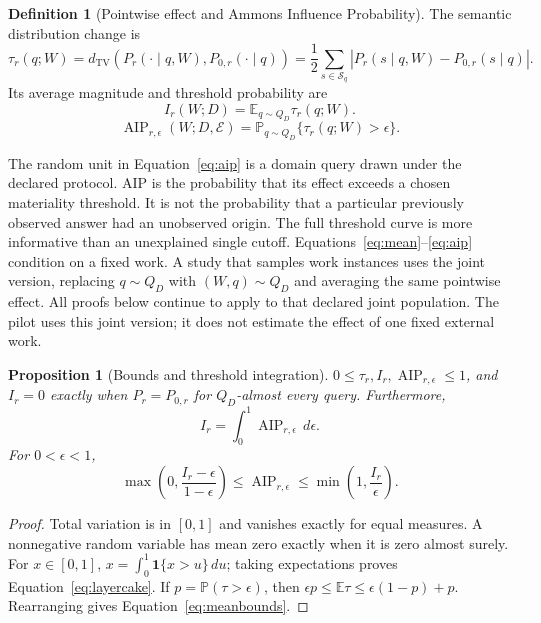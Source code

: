 \documentclass[11pt,letterpaper]{article}
\newtheorem{proposition}[theorem]{Proposition}
\theoremstyle{definition}\newtheorem{definition}[theorem]{Definition}
\newcommand{\TV}{d_{\mathrm{TV}}}
\newcommand{\AIP}{\operatorname{AIP}}
\newcommand{\E}{\mathbb{E}}
\newcommand{\Prob}{\mathbb{P}}
\newcommand{\ind}{\mathbf{1}}
\newcommand{\calE}{\mathcal{E}}
\begin{document}
\begin{definition}[Pointwise effect and Ammons Influence Probability]
The semantic distribution change is
\begin{equation}
\tau_r(q;W)=\TV\!\left(P_r(\cdot\mid q,W),P_{0,r}(\cdot\mid q)\right)
=\frac12\sum_{s\in\mathcal S_q}|P_r(s\mid q,W)-P_{0,r}(s\mid q)|.
\label{eq:tau}
\end{equation}
Its average magnitude and threshold probability are
\begin{equation}
I_r(W;D)=\E_{q\sim Q_D}\tau_r(q;W).\label{eq:mean}
\end{equation}
\begin{equation}
\boxed{\AIP_{r,\epsilon}(W;D,\calE)
=\Prob_{q\sim Q_D}\{\tau_r(q;W)>\epsilon\}.}\label{eq:aip}
\end{equation}
\end{definition}

The random unit in Equation~\eqref{eq:aip} is a domain query drawn under the declared protocol. AIP is the probability that its effect exceeds a chosen materiality threshold. It is not the probability that a particular previously observed answer had an unobserved origin. The full threshold curve is more informative than an unexplained single cutoff.
Equations~\eqref{eq:mean}--\eqref{eq:aip} condition on a fixed work. A study that samples work instances uses the joint version, replacing $q\sim Q_D$ with $(W,q)\sim Q_D$ and averaging the same pointwise effect. All proofs below continue to apply to that declared joint population. The pilot uses this joint version; it does not estimate the effect of one fixed external work.

\begin{proposition}[Bounds and threshold integration]
$0\le \tau_r,I_r,\AIP_{r,\epsilon}\le1$, and $I_r=0$ exactly when $P_r=P_{0,r}$ for $Q_D$-almost every query. Furthermore,
\begin{equation}
I_r=\int_0^1\AIP_{r,\epsilon}\,d\epsilon.
\label{eq:layercake}
\end{equation}
For $0<\epsilon<1$,
\begin{equation}
\max\!\left(0,\frac{I_r-\epsilon}{1-\epsilon}\right)
\le\AIP_{r,\epsilon}
\le\min\!\left(1,\frac{I_r}{\epsilon}\right).
\label{eq:meanbounds}
\end{equation}
\end{proposition}
\begin{proof}
Total variation is in $[0,1]$ and vanishes exactly for equal measures. A nonnegative random variable has mean zero exactly when it is zero almost surely. For $x\in[0,1]$, $x=\int_0^1\ind\{x>u\}\,du$; taking expectations proves Equation~\eqref{eq:layercake}. If $p=\Prob(\tau>\epsilon)$, then $\epsilon p\le\E\tau\le\epsilon(1-p)+p$. Rearranging gives Equation~\eqref{eq:meanbounds}.
\end{proof}
\end{document}
